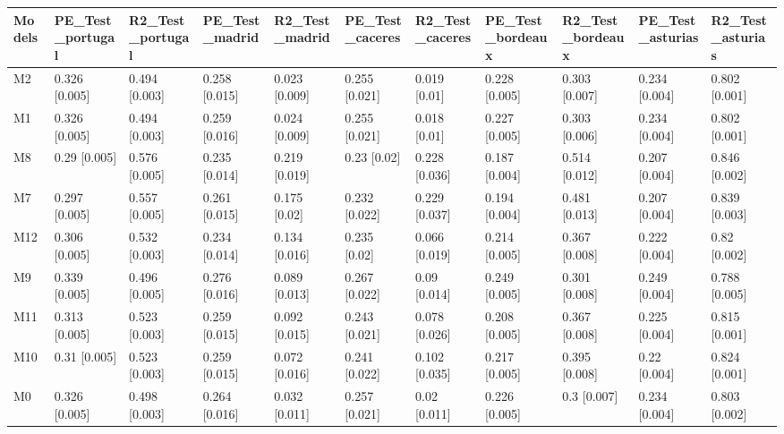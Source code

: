 \begin{table}[ht]
\centering
\begin{tabular}{lllllllllll}
  \hline
Models & PE\_Test\_portugal & R2\_Test\_portugal & PE\_Test\_madrid & R2\_Test\_madrid & PE\_Test\_caceres & R2\_Test\_caceres & PE\_Test\_bordeaux & R2\_Test\_bordeaux & PE\_Test\_asturias & R2\_Test\_asturias \\ 
  \hline
M2 & 0.326 [0.005] & 0.494 [0.003] & 0.258 [0.015] & 0.023 [0.009] & 0.255 [0.021] & 0.019 [0.01] & 0.228 [0.005] & 0.303 [0.007] & 0.234 [0.004] & 0.802 [0.001] \\ 
  M1 & 0.326 [0.005] & 0.494 [0.003] & 0.259 [0.016] & 0.024 [0.009] & 0.255 [0.021] & 0.018 [0.01] & 0.227 [0.005] & 0.303 [0.006] & 0.234 [0.004] & 0.802 [0.001] \\ 
  M8 & 0.29 [0.005] & 0.576 [0.005] & 0.235 [0.014] & 0.219 [0.019] & 0.23 [0.02] & 0.228 [0.036] & 0.187 [0.004] & 0.514 [0.012] & 0.207 [0.004] & 0.846 [0.002] \\ 
  M7 & 0.297 [0.005] & 0.557 [0.005] & 0.261 [0.015] & 0.175 [0.02] & 0.232 [0.022] & 0.229 [0.037] & 0.194 [0.004] & 0.481 [0.013] & 0.207 [0.004] & 0.839 [0.003] \\ 
  M12 & 0.306 [0.005] & 0.532 [0.003] & 0.234 [0.014] & 0.134 [0.016] & 0.235 [0.02] & 0.066 [0.019] & 0.214 [0.005] & 0.367 [0.008] & 0.222 [0.004] & 0.82 [0.002] \\ 
  M9 & 0.339 [0.005] & 0.496 [0.005] & 0.276 [0.016] & 0.089 [0.013] & 0.267 [0.022] & 0.09 [0.014] & 0.249 [0.005] & 0.301 [0.008] & 0.249 [0.004] & 0.788 [0.005] \\ 
  M11 & 0.313 [0.005] & 0.523 [0.003] & 0.259 [0.015] & 0.092 [0.015] & 0.243 [0.021] & 0.078 [0.026] & 0.208 [0.005] & 0.367 [0.008] & 0.225 [0.004] & 0.815 [0.001] \\ 
  M10 & 0.31 [0.005] & 0.523 [0.003] & 0.259 [0.015] & 0.072 [0.016] & 0.241 [0.022] & 0.102 [0.035] & 0.217 [0.005] & 0.395 [0.008] & 0.22 [0.004] & 0.824 [0.001] \\ 
  M0 & 0.326 [0.005] & 0.498 [0.003] & 0.264 [0.016] & 0.032 [0.011] & 0.257 [0.021] & 0.02 [0.011] & 0.226 [0.005] & 0.3 [0.007] & 0.234 [0.004] & 0.803 [0.002] \\ 
   \hline
\end{tabular}
\end{table}
